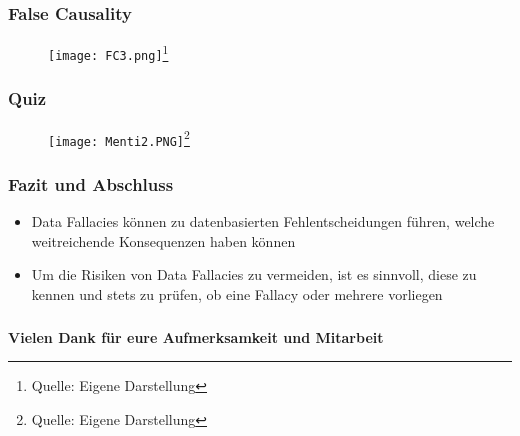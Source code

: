 \documentclass{beamer}
\begin{document}
\begin{frame}
\frametitle{False Causality}

\begin{figure}
    \centering
    \texttt{[image: FC3.png]}\footnote{Quelle: {Eigene Darstellung}}
    
\end{figure}

\end{frame}

\begin{frame}
\frametitle{Quiz}

\begin{figure}
    \centering
    \texttt{[image: Menti2.PNG]}\footnote{Quelle: {Eigene Darstellung}}
    
\end{figure}

\end{frame}

\begin{frame}
\frametitle{Fazit und Abschluss}
\begin{itemize}
    \item Data Fallacies können zu datenbasierten Fehlentscheidungen führen, welche weitreichende Konsequenzen haben können
    \item Um die Risiken von Data Fallacies zu vermeiden, ist es sinnvoll, diese zu kennen und stets zu prüfen, ob eine Fallacy oder mehrere vorliegen
    
\end{itemize}
\end{frame}

\begin{frame}
\frametitle{}
\centering
    \textbf{Vielen Dank für eure Aufmerksamkeit und Mitarbeit}
\end{frame}
\end{document}
